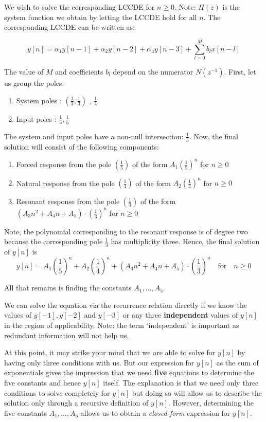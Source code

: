 \documentclass{article}
\theoremstyle{definition}
\begin{document}
We wish to solve the corresponding LCCDE for $n \geq 0$. Note: $H(z)$ is the system function we obtain by letting the LCCDE hold for all $n$. The corresponding LCCDE can be written as:

\[
    y[n] = \alpha_1y[n-1] + \alpha_2y[n-2] + \alpha_3y[n-3] + \sum_{l=0}^{M} b_l x[n-l]
\]

The value of $M$ and coefficients $b_l$ depend on the numerator $N(z^{-1})$. First, let us group the poles: 

\begin{enumerate}
    \item System poles : $(\frac{1}{3} , \frac{1}{3})$ , $\frac{1}{4}$
    \item Input poles : $\frac{1}{3} , \frac{1}{5}$
\end{enumerate}

The system and input poles have a non-null intersection: $\frac{1}{3}$. Now, the final solution will consist of the following components:

\begin{enumerate}
    \item Forced response from the pole $(\frac{1}{5})$ of the form $A_1 (\frac{1}{5})^n$ for $n \geq 0$
    \item Natural response from the pole $(\frac{1}{4})$ of the form $A_2 (\frac{1}{4})^n$ for $n \geq 0$
    \item Resonant response from the pole $(\frac{1}{3})$ of the form $(A_3n^2 + A_4n + A_5) \cdot (\frac{1}{3})^n$ for $n \geq 0$
\end{enumerate}

Note, the polynomial corresponding to the resonant response is of degree two because the corresponding pole $\frac{1}{3}$ has multiplicity three. Hence, the final solution of $y[n]$ is 
\[
    y[n] = A_1 \left( \frac{1}{5}\right)^n + A_2 \left( \frac{1}{4} \right)^n + (A_3n^2 + A_4n + A_5) \cdot \left( \frac{1}{3} \right)^n \quad \text{for} \quad n \geq 0
\]

All that remains is finding the constants $A_1, \ldots ,A_5$. 

We can solve the equation via the recurrence relation directly if we know the values of $y[-1], y[-2]$ and $y[-3]$ or any three \textbf{independent} values of $y[n]$ in the region of applicability. Note: the term `independent' is important as redundant information will not help us.  \smallskip

At this point, it may strike your mind that we are able to solve for $y[n]$ by having only three conditions with us. But our expression for $y[n]$ as the sum of exponentials gives the impression that we need \textbf{five} equations to determine the five constants and hence $y[n]$ itself. The explanation is that we need only three conditions to solve completely for $y[n]$ but doing so will allow us to describe the solution only through a recursive definition of $y[n]$. However, determining the five constants $A_1, \ldots ,A_5$ allows us to obtain a \textit{closed-form} expression for $y[n]$.  \smallskip
\end{document}
